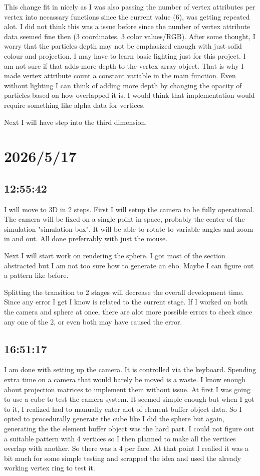 \documentclass{article}
\begin{document}
This change fit in nicely as I was also passing the number of vertex attributes per vertex into necassary
functions since the current value (6), was getting repeated alot. I did not think this was a issue before
since the number of vertex attribute data seemed fine then (3 coordinates, 3 color values/RGB). After some
thought, I worry that the particles depth may not be emphasized enough with just solid colour and projection.
I may have to learn basic lighting just for this project. I am not sure if that adds more depth to the vertex
array object. That is why I made vertex attribute count a constant variable in the main function. Even without
lighting I can think of adding more depth by changing the opacity of particles based on how overlapped it is. 
I would think that implementation would require something like alpha data for vertices.

Next I will have step into the third dimension.

\section*{2026/5/17}
\subsection*{12:55:42}
I will move to 3D in 2 steps. First I will setup the camera to be fully operational. The camera will be 
fixed on a single point in space, probably the center of the simulation "simulation box". It will be 
able to rotate to variable angles and zoom in and out. All done preferrably with just the mouse.

Next I will start work on rendering the sphere. I got most of the section abstracted but I am not too 
sure how to generate an ebo. Maybe I can figure out a pattern like before.

Splitting the transition to 2 stages will decrease the overall development time. Since any error I get I 
know is related to the current stage. If I worked on both the camera and sphere at once, there are alot
more possible errors to check since any one of the 2, or even both may have caused the error.

\subsection*{16:51:17}
I am done with setting up the camera. It is controlled via the keyboard. Spending extra time on a camera
that would barely be moved is a waste. I know enough about projection matrices to implement them without 
issue. At first I was going to use a cube to test the camera system. It seemed simple enough but when I
got to it, I realized had to manually enter alot of element buffer object data. So I opted to procedurally
generate the cube like I did the sphere but again, generating the the element buffer object was the 
hard part. I could not figure out a suitable pattern with 4 vertices so I then planned to make all the
vertices overlap with another. So there was a 4 per face. At that point I realied it was a bit much for
some simple testing and scrapped the idea and used the already working vertex ring to test it.
\end{document}
